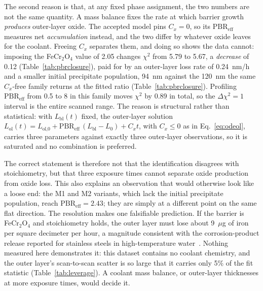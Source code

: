 \documentclass[pdflatex,sn-nature]{sn-jnl}
\begin{document}
The second reason is that, at any fixed phase assignment, the two
numbers are not the same quantity. A mass balance fixes the rate at
which barrier growth \emph{produces} outer-layer oxide. The accepted
model pins $C_x = 0$, so its $\mathrm{PBR}_\text{eff}$ measures net
\emph{accumulation} instead, and the two differ by whatever oxide leaves
for the coolant. Freeing $C_x$ separates them, and doing so shows the
data cannot: imposing the FeCr$_2$O$_4$ value of 2.05 changes $\chi^2$
from 5.79 to 5.67, a \emph{decrease} of 0.12
(Table~\ref{tab:pbrclosure}), paid for by an outer-layer loss rate of
0.24~nm/h and a smaller initial precipitate population, 94~nm against
the 120~nm the same $C_x$-free family returns at the fitted ratio
(Table~\ref{tab:pbrclosure}). Profiling $\mathrm{PBR}_\text{eff}$ from 0.5 to 8 in this family
moves $\chi^2$ by 0.89 in total, so the $\Delta\chi^2 = 1$ interval is
the entire scanned range. The reason is structural rather than
statistical: with $L_\text{bl}(t)$ fixed, the outer-layer solution
$L_\text{ol}(t) = L_\text{ol,0} + \mathrm{PBR}_\text{eff}\,
(L_\text{bl} - L_0) + C_x t$, with $C_x \le 0$ as in
Eq.~\eqref{eq:odeol}, carries three parameters against exactly
three outer-layer observations, so it is saturated and no combination is
preferred.

The correct statement is therefore not that the identification disagrees
with stoichiometry, but that three exposure times cannot separate oxide
production from oxide loss. This also explains an observation that would
otherwise look like a loose end: the M1 and M2 variants, which lack the
initial precipitate population, reach $\mathrm{PBR}_\text{eff} = 2.43$;
they are simply at a different point on the same flat direction. The
resolution makes one falsifiable prediction. If the barrier is
FeCr$_2$O$_4$ and stoichiometry holds, the outer layer must lose about
9~$\mu$g of iron per square decimeter per hour, a magnitude
consistent with the corrosion-product release reported for stainless
steels in high-temperature water~\citep{lister1987release}. Nothing
measured here demonstrates it: this dataset contains no coolant
chemistry, and the outer layer's scan-to-scan scatter is so large that
it carries only 5\% of the fit statistic (Table~\ref{tab:leverage}). A
coolant mass balance, or outer-layer thicknesses at more exposure times,
would decide it.
\end{document}
